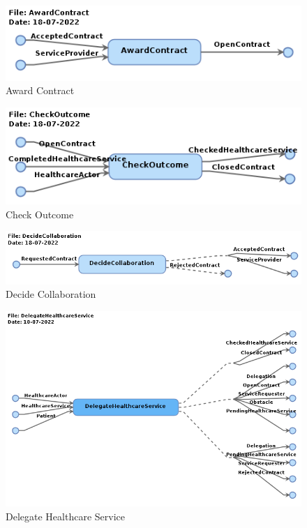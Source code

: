 \begin{figure}
    \centering
    \includegraphics[width=\textwidth]{frontend/public/images/AwardContract.png}
    \caption{Award Contract}
    \label{appendix:fig:AwardContract}
\end{figure}

\begin{figure}
    \centering
    \includegraphics[width=\textwidth]{overleaf/images/testing/CheckOutcome.png}
    \caption{Check Outcome}
    \label{appendix:fig:CheckOutcome}
\end{figure}

\begin{figure}
    \centering
    \includegraphics[width=\textwidth]{overleaf/images/testing/DecideCollaboration.png}
    \caption{Decide Collaboration}
    \label{appendix:fig:DecideCollaboration}
\end{figure}

\begin{figure}
    \centering
    \includegraphics[width=\textwidth]{overleaf/images/testing/DelegateHealthcareService.png}
    \caption{Delegate Healthcare Service}
    \label{appendix:fig:DelegateHealthcareService}
\end{figure}

